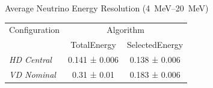\centering
Average Neutrino Energy Resolution (\qtyrange{4}{20}{\mega\electronvolt})\\
\begin{tabular}{lcc}
\toprule
Configuration & \multicolumn{2}{c}{Algorithm} \\
 & TotalEnergy & SelectedEnergy \\
\midrule
\emph{HD Central} & 0.141 ± 0.006 & 0.138 ± 0.006 \\
\emph{VD Nominal} & 0.31 ± 0.01 & 0.183 ± 0.006 \\
\bottomrule
\end{tabular}

